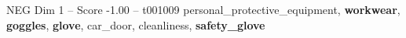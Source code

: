 \begin{textsample}{NEG Dim 1 – Score -1.00 – t001009}  \label{ex:f1_neg_028}
personal\_protective\_equipment, \textbf{workwear}, \textbf{goggles}, \textbf{glove}, car\_door, cleanliness, \textbf{safety\_glove}

\end{textsample}
